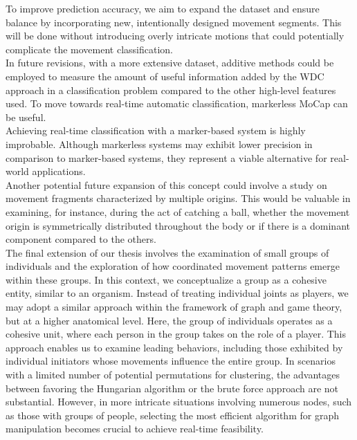 To improve prediction accuracy, we aim to expand the dataset and ensure balance by incorporating new, intentionally designed movement segments.
This will be done without introducing overly intricate motions that could potentially complicate the movement classification.\\

In future revisions, with a more extensive dataset, additive methods could be employed to measure the amount of useful information added by the WDC approach in a classification problem compared to the other high-level features used.
To move towards real-time automatic classification, markerless MoCap can be useful.\\

Achieving real-time classification with a marker-based system is highly improbable.
Although markerless systems may exhibit lower precision in comparison to marker-based systems, 
they represent a viable alternative for real-world applications.\\

Another potential future expansion of this concept could involve a study on movement fragments characterized by multiple origins.
This would be valuable in examining, for instance, during the act of catching a ball, whether the movement origin is symmetrically distributed throughout the body or if there is a dominant component compared to the others.\\

The final extension of our thesis involves the examination of small groups of individuals and the exploration of how coordinated movement patterns emerge within these groups.
In this context, we conceptualize a group as a cohesive entity, similar to an organism.
Instead of treating individual joints as players, we may adopt a similar approach within the framework of graph and game theory, but at a higher anatomical level.
Here, the group of individuals operates as a cohesive unit, where each person in the group takes on the role of a player. 
This approach enables us to examine leading behaviors, including those exhibited by individual initiators whose movements influence the entire group.
In scenarios with a limited number of potential permutations for clustering, the advantages between favoring the Hungarian algorithm or the brute force approach are not substantial. 
However, in more intricate situations involving numerous nodes, such as those with groups of people, selecting the most efficient algorithm for graph manipulation becomes crucial to achieve real-time feasibility.
